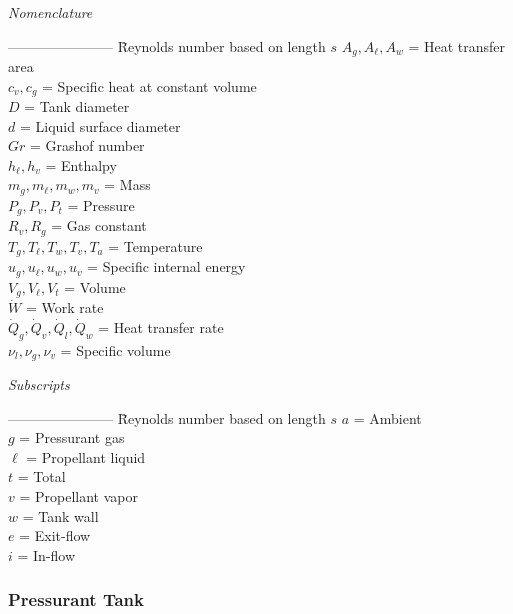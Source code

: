  \noindent\textit{Nomenclature}\vspace{-.1 in}
\begin{tabbing}
    -----------------------     \= Reynolds number based on length $s$ \kill
    $A_g,A_\ell,A_w$    \> = Heat transfer area     \\
    $c_v, c_g$        \>  = Specific heat at constant volume     \\
    $D$        \>  = Tank diameter     \\
    $d$        \>  = Liquid surface diameter    \\
    $Gr$        \>  = Grashof number  \\
    $h_\ell, h_v$        \>  = Enthalpy     \\
    $m_g,m_\ell,m_w,m_v$    \> = Mass   \\
    $P_g,P_v,P_t$    \> = Pressure   \\
    $R_v,R_g$    \> = Gas constant   \\
    $T_g,T_\ell,T_w,T_v,T_a$    \> = Temperature   \\
    $u_g,u_\ell,u_w,u_v$    \> = Specific internal energy   \\
    $V_g,V_\ell,V_t$    \> = Volume   \\
    $\dot{W}$    \> = Work rate   \\
    $\dot{Q}_g,\dot{Q}_v,\dot{Q}_l,\dot{Q}_w$    \> = Heat transfer rate     \\
    $\nu_l,\nu_g,\nu_v$    \> = Specific volume  \\
\end{tabbing}
%
\noindent\textit{Subscripts}\vspace{-.1 in}
\begin{tabbing}
    -----------------------     \= Reynolds number based on length $s$ \kill
    $a$    \> = Ambient    \\
    $g$    \> = Pressurant gas    \\
    $\ell$    \> = Propellant liquid  \\
    $t$    \> = Total    \\
    $v$    \> = Propellant vapor \\
    $w$    \> = Tank wall      \\
    $e$    \> = Exit-flow      \\
    $i$    \> = In-flow
\end{tabbing}


\subsubsection{Pressurant Tank}


